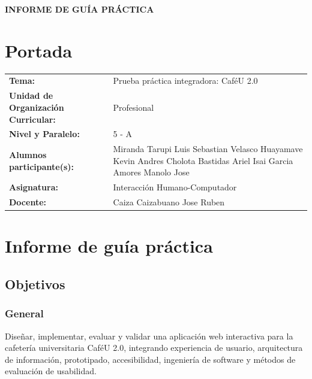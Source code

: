 \documentclass{article}
\begin{document}
\begin{center}
    {\large \textbf{INFORME DE GUÍA PRÁCTICA}} \\
\end{center}

\section{Portada}
\begin{flushleft}
\begin{tabular}{ l p{8cm} }
    \textbf{Tema:} & Prueba práctica integradora: CaféU 2.0 \\
    \textbf{Unidad de Organización Curricular:} & Profesional \\
    \textbf{Nivel y Paralelo:} &  5 - A \\
    \textbf{Alumnos participante(s):} &
        Miranda Tarupi Luis Sebastian \newline
        Velasco Huayamave Kevin Andres \newline
        Cholota Bastidas Ariel Isai \newline
        Garcia Amores Manolo Jose \\
    \textbf{Asignatura:} & Interacción Humano-Computador \\
    \textbf{Docente:} & Caiza Caizabuano Jose Ruben \\
\end{tabular}
\end{flushleft}

\section{Informe de guía práctica}
\subsection{Objetivos}
\subsubsection{General}
Diseñar, implementar, evaluar y validar una aplicación web interactiva para la cafetería universitaria CaféU 2.0, integrando experiencia de usuario, arquitectura de información, prototipado, accesibilidad, ingeniería de software y métodos de evaluación de usabilidad.
\end{document}
